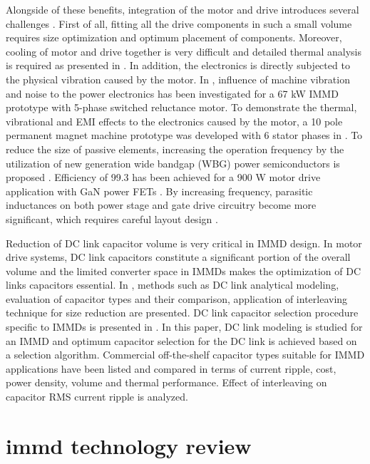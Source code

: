 \documentclass[conference,a4paper,twocolumn]{IEEEtran}
\begin{document}
Alongside of these benefits, integration of the motor and drive introduces several challenges \cite{LoCalzo2016,Wang2015}. First of all, fitting all the drive components in such a small volume requires size optimization and optimum placement of components. Moreover, cooling of motor and drive together is very difficult and detailed thermal analysis is required as presented in \cite{Lambert2015b}. In addition, the electronics is directly subjected to the physical vibration caused by the motor. In \cite{Hennen2012}, influence of machine vibration and noise to the power electronics has been investigated for a 67 kW IMMD prototype with 5-phase switched reluctance motor. To demonstrate the thermal, vibrational and EMI effects to the electronics caused by the motor, a 10 pole permanent magnet machine prototype was developed with 6 stator phases in \cite{Jahns2014}. To reduce the size of passive elements, increasing the operation frequency by the utilization of new generation wide bandgap (WBG) power semiconductors is proposed \cite{Lambert2015a,Wang2015}. Efficiency of 99.3 has been achieved for a 900 W motor drive application with GaN power FETs \cite{Morita2011}. By increasing frequency, parasitic inductances on both power stage and gate drive circuitry become more significant, which requires careful layout design \cite{LoCalzo2016}. 

Reduction of DC link capacitor volume is very critical in IMMD design. In motor drive systems, DC link capacitors constitute a significant portion of the overall volume and the limited converter space in IMMDs makes the optimization of DC links capacitors essential. In \cite{Su2010,Bianchi2003,Zhang2010}, methods such as DC link analytical modeling, evaluation of capacitor types and their comparison, application of interleaving technique for size reduction are presented. DC link capacitor selection procedure specific to IMMDs is presented in \cite{LoCalzo2016,Wang2014,Wang2015}.
In this paper, DC link modeling is studied for an IMMD and optimum capacitor selection for the DC link is achieved based on a selection algorithm. Commercial off-the-shelf capacitor types suitable for IMMD applications have been listed and compared in terms of current ripple, cost, power density, volume and thermal performance. Effect of interleaving on capacitor RMS current ripple is analyzed.






\section{immd technology review}
\end{document}
